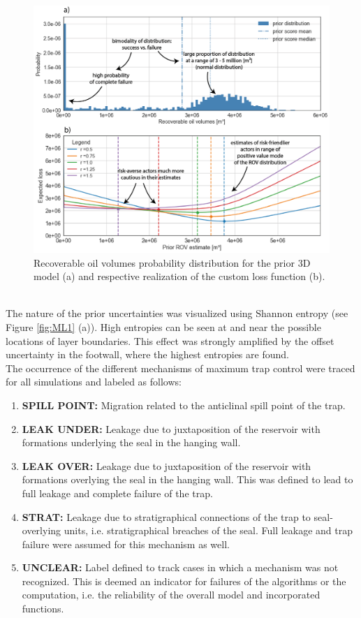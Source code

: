 		\begin{figure}[h]
			\centering
			\includegraphics[width=1\textwidth]{Figures/M_prior}
			\caption{Recoverable oil volumes probability distribution for the prior 3D model (a) and respective realization of the custom loss function (b).}\label{fig:M_prior}
		\end{figure}\\
		The nature of the prior uncertainties was visualized using Shannon entropy (see Figure \ref{fig:ML1} (a)). High entropies can be seen at and near the possible locations of layer boundaries. This effect was strongly amplified by the offset uncertainty in the footwall, where the highest entropies are found.\\
		The occurrence of the different mechanisms of maximum trap control were traced for all simulations and labeled as follows:
		\begin{enumerate}
		\item \textbf{SPILL POINT:} Migration related to the anticlinal spill point of the trap.
		\item \textbf{LEAK UNDER:} Leakage due to juxtaposition of the reservoir with formations underlying the seal in the hanging wall.
		\item \textbf{LEAK OVER:} Leakage due to juxtaposition of the reservoir with formations overlying the seal in the hanging wall. This was defined to lead to full leakage and complete failure of the trap.
		\item \textbf{STRAT:} Leakage due to stratigraphical connections of the trap to seal-overlying units, i.e. stratigraphical breaches of the seal. Full leakage and trap failure were assumed for this mechanism as well.
		\item \textbf{UNCLEAR:} Label defined to track cases in which a mechanism was not recognized. This is deemed an indicator for failures of the algorithms or the computation, i.e. the reliability of the overall model and incorporated functions. 
		\end{enumerate}
